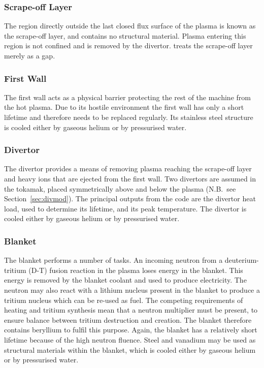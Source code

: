 \subsubsection{Scrape-off Layer}
The region directly outside the last closed flux surface of the plasma is
known as the scrape-off layer, and contains no structural material.  Plasma
entering this region is not confined and is removed by the divertor. \PS
treats the scrape-off layer merely as a gap.

\subsubsection{First Wall}
The first wall acts as a physical barrier protecting the rest of the machine
from the hot plasma. Due to its hostile environment the first wall has only a
short lifetime and therefore needs to be replaced regularly. Its stainless
steel structure is cooled either by gaseous helium or by pressurised water.

\subsubsection{Divertor}
The divertor provides a means of removing plasma reaching the scrape-off layer
and heavy ions that are ejected from the first wall.  Two divertors are
assumed in the \PS tokamak, placed symmetrically above and below the plasma
(N.B.\ see Section~\ref{sec:divmod}). The principal outputs from the code
are the divertor heat load, used to determine its lifetime, and its peak
temperature. The divertor is cooled either by gaseous helium or by pressurised
water.

\subsubsection{Blanket}
The blanket performs a number of tasks. An incoming neutron from a
deuterium-tritium (D-T) fusion reaction in the plasma loses energy in the
blanket. This energy is removed by the blanket coolant and used to produce
electricity. The neutron may also react with a lithium nucleus present in the
blanket to produce a tritium nucleus which can be re-used as fuel. The
competing requirements of heating and tritium synthesis mean that a neutron
multiplier must be present, to ensure balance between tritium destruction and
creation. The blanket therefore contains beryllium to fulfil this
purpose. Again, the blanket has a relatively short lifetime because of the
high neutron fluence. Steel and vanadium may be used as structural materials
within the blanket, which is cooled either by gaseous helium or by pressurised
water.

